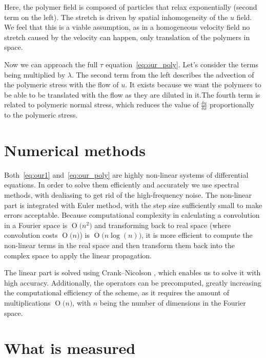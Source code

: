 \documentclass[11pt,a4paper]{article}
\newcommand{\BigO}[1]{\ensuremath{\operatorname{O}\bigl(#1\bigr)}}
\begin{document}
Here, the polymer field is composed of particles that relax exponentially (second term on the left).
The stretch is driven by spatial inhomogeneity of the $u$ field.
We feel that this is a viable assumption, as in a homogeneous velocity field no stretch caused by the velocity can happen, only translation of the polymers in space.

Now we can approach the full $\tau$ equation~\eqref{eq:our_poly}.
Let's consider the terms being multiplied by $\lambda$.
The second term from the left describes the advection of the polymeric stress with the flow of $u$.
It exists because we want the polymers to be able to be translated with the flow as they are diluted in it.The fourth term is related to polymeric normal stress, which reduces the value of $\frac{\delta u}{\delta x}$ proportionally to the polymeric stress.

\section{Numerical methods}
Both~\eqref{eq:our1} and~\eqref{eq:our_poly} are highly non-linear systems of differential equations.
In order to solve them efficiently and accurately we use spectral methods\cite{Orszag80}, with dealiasing to get rid of the high-frequency noise.
The non-linear part is integrated with Euler method, with the step size sufficiently small to make errors acceptable.
Because computational complexity in calculating a convolution in a Fourier space is \BigO{n^2} and transforming back to real space (where convolution costs \BigO{n}) is \BigO{n\log(n)}, it is more efficient to compute the non-linear terms in the real space and then transform them back into the complex space to apply the linear propagation.

The linear part is solved using Crank--Nicolson , which enables us to solve it with high accuracy.
Additionally, the operators can be precomputed, greatly increasing the computational efficiency of the scheme, as it requires the amount of multiplications \BigO{n}, with $n$ being the number of dimensions in the Fourier space.


\section{What is measured}
\end{document}
